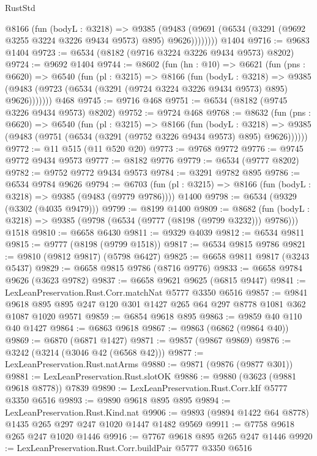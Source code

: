 \begin{lexlean}{RustStd}
\begin{coremodule}
          @8166
            (fun (bodyL : @3218) =>
            @9385
              (@9483 (@9691 (@6534 (@3291 (@9692 @3255 @3224 @3226 @9434 @9573) @895) @9626))))))))
    @1404
@9716 := @9683 @1404
@9723 := @6534 (@8182 (@9716 @3224 @3226 @9434 @9573) @8202)
@9724 := @9692 @1404
@9744 := @8602
    (fun (hn : @10) =>
    @6621
      (fun (pns : @6620) =>
      @6540
        (fun (pl : @3215) =>
        @8166
          (fun (bodyL : @3218) =>
          @9385 (@9483 (@9723 (@6534 (@3291 (@9724 @3224 @3226 @9434 @9573) @895) @9626)))))))
    @468
@9745 := @9716 @468
@9751 := @6534 (@8182 (@9745 @3226 @9434 @9573) @8202)
@9752 := @9724 @468
@9768 := @8632
    (fun (pns : @6620) =>
    @6540
      (fun (pl : @3215) =>
      @8166
        (fun (bodyL : @3218) =>
        @9385 (@9483 (@9751 (@6534 (@3291 (@9752 @3226 @9434 @9573) @895) @9626))))))
@9772 := @11 @515 (@11 @520 @20)
@9773 := @9768 @9772
@9776 := @9745 @9772 @9434 @9573
@9777 := @8182 @9776
@9779 := @6534 (@9777 @8202)
@9782 := @9752 @9772 @9434 @9573
@9784 := @3291 @9782 @895
@9786 := @6534 @9784 @9626
@9794 := @6703
    (fun (pl : @3215) => @8166 (fun (bodyL : @3218) => @9385 (@9483 (@9779 @9786))))
    @1400
@9798 := @6534 (@9329 (@3302 (@4035 @9479)))
@9799 := @8199 @1400
@9809 := @8682
    (fun (bodyL : @3218) => @9385 (@9798 (@6534 (@9777 (@8198 (@9799 @3232))) @9786)))
    @1518
@9810 := @6658 @6430
@9811 := @9329 @4039
@9812 := @6534 @9811
@9815 := @9777 (@8198 (@9799 @1518))
@9817 := @6534 @9815 @9786
@9821 := @9810 (@9812 @9817) (@5798 @6427)
@9825 := @6658 @9811 @9817 (@3243 @5437)
@9829 := @6658 @9815 @9786 (@8716 @9776)
@9833 := @6658 @9784 @9626 (@3623 @9782)
@9837 := @6658 @9621 @9625 (@6815 @9447)
@9841 := LexLeanPreservation.Rust.Corr.matchNat @5777 @3350 @6516
@9857 := @9841 @9618 @895 @895 @247 @120 @301 @1427 @265 @64 @297 @8778 @1081 @362 @1087 @1020 @9571
@9859 := @6854 @9618 @895
@9863 := @9859 @40 @110 @40 @1427
@9864 := @6863 @9618
@9867 := @9863 (@6862 (@9864 @40))
@9869 := @6870 (@6871 @1427)
@9871 := @9857 (@9867 @9869)
@9876 := @3242 (@3214 (@3046 @42 (@6568 @42)))
@9877 := LexLeanPreservation.Rust.natArms
@9880 := @9871 (@9876 (@9877 @301))
@9881 := LexLeanPreservation.Rust.slotOK
@9886 := @9880 (@3623 (@9881 @9618 @8778)) @7839
@9890 := LexLeanPreservation.Rust.Corr.kIf @5777 @3350 @6516
@9893 := @9890 @9618 @895 @895
@9894 := LexLeanPreservation.Rust.Kind.nat
@9906 := @9893 (@9894 @1422 @64 @8778) @1435 @265 @297 @247 @1020 @1447 @1482 @9569
@9911 := @7758 @9618 @265 @247 @1020 @1446
@9916 := @7767 @9618 @895 @265 @247 @1446
@9920 := LexLeanPreservation.Rust.Corr.buildPair @5777 @3350 @6516

\end{coremodule}
\end{lexlean}
